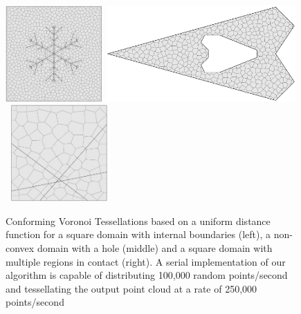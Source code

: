 \begin{figure}[htb]
\centering
{\includegraphics[height=3.7cm]{./ebeida/snowflake_voronoi.png}}$\,$
{\includegraphics[height=3.7cm]{./ebeida/wedge_voronoi.png}} $\,$
{\includegraphics[height=3.7cm]{./ebeida/cracks_voronoi.png}}
\caption{Conforming Voronoi Tessellations based on a uniform distance function for a square domain with internal boundaries (left), a non-convex domain with a hole (middle) and a square domain with multiple regions in contact (right). A serial implementation of our algorithm is capable of distributing 100,000 random points/second and tessellating the output point cloud at a rate of 250,000 points/second}
\label{fig:cdt_steps}
\end{figure}